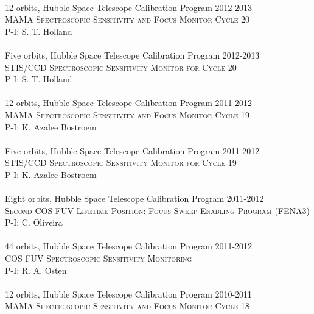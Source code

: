 \documentclass[10pt]{cv}
\begin{document}
\begin{llist}
\\
12 orbits, Hubble Space Telescope Calibration Program \hfill  2012-2013\\ %
\textsc{MAMA Spectroscopic Sensitivity and Focus Monitor Cycle 20}\\
P-I: S. T. Holland\\ %
\\
Five orbits, Hubble Space Telescope Calibration Program \hfill  2012-2013\\ %
\textsc{STIS/CCD Spectroscopic Sensitivity Monitor for Cycle 20} \\
P-I: S. T. Holland\\ %
\\
12 orbits, Hubble Space Telescope Calibration Program \hfill 2011-2012\\ %
\textsc{MAMA Spectroscopic Sensitivity and Focus Monitor Cycle 19}\\
P-I: K. Azalee Bostroem \\ %
\\
Five orbits, Hubble Space Telescope Calibration Program \hfill 2011-2012\\ %
\textsc{STIS/CCD Spectroscopic Sensitivity Monitor for Cycle 19}\\
P-I: K. Azalee Bostroem \\ %
\\
Eight orbits, Hubble Space Telescope Calibration Program \hfill 2011-2012\\ %
\textsc{Second COS FUV Lifetime Position: Focus Sweep Enabling Program (FENA3)} \\
P-I: C. Oliveira \\%
\\
44 orbits, Hubble Space Telescope Calibration Program \hfill 2011-2012\\ %
\textsc{COS FUV Spectroscopic Sensitivity Monitoring} \\
P-I: R. A. Osten\\%
\\
12 orbits, Hubble Space Telescope Calibration Program \hfill 2010-2011\\ %
\textsc{MAMA Spectroscopic Sensitivity and Focus Monitor Cycle 18} \\

\end{llist}
\end{document}
